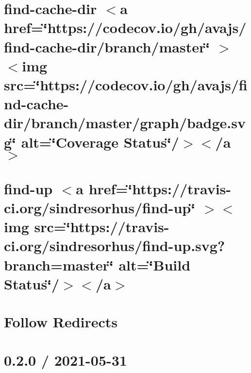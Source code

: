 \documentclass[twoside]{book}
\newcommand{\+}{\discretionary{\mbox{\scriptsize$\hookleftarrow$}}{}{}}
\begin{document}
\chapter{find-\/cache-\/dir \texorpdfstring{$<$}{<}a href=\char`\"{}https\+://codecov.\+io/gh/avajs/find-\/cache-\/dir/branch/master\char`\"{} \texorpdfstring{$>$}{>}\texorpdfstring{$<$}{<}img src=\char`\"{}https\+://codecov.\+io/gh/avajs/find-\/cache-\/dir/branch/master/graph/badge.\+svg\char`\"{} alt=\char`\"{}\+Coverage Status\char`\"{}/\texorpdfstring{$>$}{>}\texorpdfstring{$<$}{<}/a\texorpdfstring{$>$}{>}}
\label{md__c___users_vaishnavi_jadhav__desktop__developer_code_mean_stack_example_client_node_modules_find_cache_dir_readme}

\chapter{find-\/up \texorpdfstring{$<$}{<}a href=\char`\"{}https\+://travis-\/ci.\+org/sindresorhus/find-\/up\char`\"{} \texorpdfstring{$>$}{>}\texorpdfstring{$<$}{<}img src=\char`\"{}https\+://travis-\/ci.\+org/sindresorhus/find-\/up.\+svg?branch=master\char`\"{} alt=\char`\"{}\+Build Status\char`\"{}/\texorpdfstring{$>$}{>}\texorpdfstring{$<$}{<}/a\texorpdfstring{$>$}{>}}
\label{md__c___users_vaishnavi_jadhav__desktop__developer_code_mean_stack_example_client_node_modules_find_up_readme}

\chapter{Follow Redirects}
\label{md__c___users_vaishnavi_jadhav__desktop__developer_code_mean_stack_example_client_node_modules_follow_redirects__r_e_a_d_m_e}

\chapter{0.2.0 / 2021-\/05-\/31}
\label{md__c___users_vaishnavi_jadhav__desktop__developer_code_mean_stack_example_client_node_modules_forwarded__h_i_s_t_o_r_y}

\end{document}
